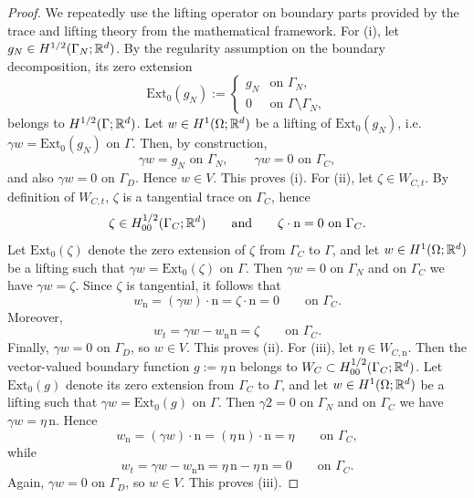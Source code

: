 \begin{proof}
	We repeatedly use the lifting operator on boundary parts provided by the trace and lifting theory from the mathematical framework. For (i), let $g_N\in H^{1/2}(\Gamma_N;{\mathbb R}^d)$. By the regularity assumption on the boundary decomposition, its zero extension
	\begin{equation*}
		\mathrm{Ext}_0(g_N)
		:=
		\begin{cases}
			g_N & \text{on }\Gamma_N,                \\
			0   & \text{on }\Gamma\setminus\Gamma_N,
		\end{cases}
	\end{equation*}
	belongs to $H^{1/2}(\Gamma;{\mathbb R}^d)$. Let $w\in H^1(\Omega;{\mathbb R}^d)$ be a lifting of $\mathrm{Ext}_0(g_N)$, i.e. $\gamma w=\mathrm{Ext}_0(g_N)$ on $\Gamma$. Then, by construction,
	\begin{equation*}
		\gamma w=g_N \text{ on }\Gamma_N,
		\qquad
		\gamma w=0 \text{ on }\Gamma_C,
	\end{equation*}
	and also $\gamma w=0$ on $\Gamma_D$. Hence $w\in V$. This proves (i). For (ii), let $\zeta\in W_{C,t}$. By definition of $W_{C,t}$, $\zeta$ is a tangential trace on $\Gamma_C$, hence
	\begin{equation*}
		\zeta\in H^{1/2}_{00}(\Gamma_C;{\mathbb R}^d)
		\qquad\text{and}\qquad
		\zeta\cdot \mathrm n=0 \text{ on }\Gamma_C.
	\end{equation*}
	Let $\mathrm{Ext}_0(\zeta)$ denote the zero extension of $\zeta$ from $\Gamma_C$ to $\Gamma$, and let $w\in H^1(\Omega;{\mathbb R}^d)$ be a lifting such that $\gamma w=\mathrm{Ext}_0(\zeta)$ on $\Gamma$. Then $\gamma w = 0$ on $\Gamma_N$ and on $\Gamma_C$ we have $\gamma w = \zeta$. Since $\zeta$ is tangential, it follows that
	\begin{equation*}
		w_{\mathrm n}
		=
		(\gamma w)\cdot \mathrm n
		=
		\zeta\cdot \mathrm n
		=
		0
		\qquad\text{on }\Gamma_C.
	\end{equation*}
	Moreover,
	\begin{equation*}
		w_t
		=
		\gamma w-w_{\mathrm n}\mathrm n
		=
		\zeta
		\qquad\text{on }\Gamma_C.
	\end{equation*}
	Finally, $\gamma w=0$ on $\Gamma_D$, so $w\in V$. This proves (ii). For (iii), let $\eta\in W_{C,\mathrm n}$. Then the vector-valued boundary function $g:=\eta\,\mathrm n$ belongs to $W_C\subset H^{1/2}_{00}(\Gamma_C;{\mathbb R}^d)$. Let $\mathrm{Ext}_0(g)$ denote its zero extension from $\Gamma_C$ to $\Gamma$, and let $w\in H^1(\Omega;{\mathbb R}^d)$ be a lifting such that $\gamma w = \mathrm{Ext}_0(g)$ on $\Gamma$. Then $\gamma 2 = 0$ on $\Gamma_N$ and on $\Gamma_C$ we have $\gamma w=\eta\,\mathrm n$. Hence
	\begin{equation*}
		w_{\mathrm n}
		=
		(\gamma w)\cdot \mathrm n
		=
		(\eta\,\mathrm n)\cdot \mathrm n
		=
		\eta
		\qquad\text{on }\Gamma_C,
	\end{equation*}
	while
	\begin{equation*}
		w_t
		=
		\gamma w-w_{\mathrm n}\mathrm n
		=
		\eta\,\mathrm n-\eta\,\mathrm n
		=
		0
		\qquad\text{on }\Gamma_C.
	\end{equation*}
	Again, $\gamma w=0$ on $\Gamma_D$, so $w\in V$. This proves (iii).
\end{proof}

